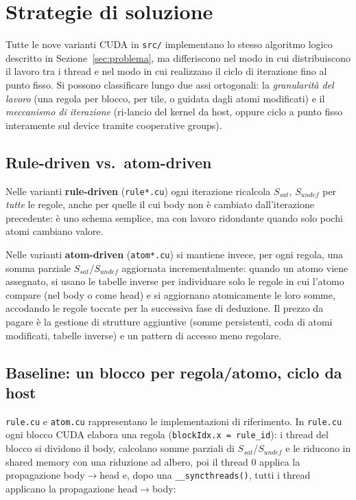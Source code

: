 \documentclass[11pt,a4paper]{article}
\begin{document}
\section{Strategie di soluzione}
\label{sec:strategie}

Tutte le nove varianti CUDA in \texttt{src/} implementano lo stesso algoritmo logico descritto in
Sezione~\ref{sec:problema}, ma differiscono nel modo in cui distribuiscono il lavoro tra i thread e
nel modo in cui realizzano il ciclo di iterazione fino al punto fisso. Si possono classificare
lungo due assi ortogonali: la \emph{granularità del lavoro} (una regola per blocco, per tile, o
guidata dagli atomi modificati) e il \emph{meccanismo di iterazione} (ri-lancio del kernel da host,
oppure ciclo a punto fisso interamente sul device tramite cooperative groups).

\subsection{Rule-driven vs.\ atom-driven}

Nelle varianti \textbf{rule-driven} (\texttt{rule*.cu}) ogni iterazione ricalcola $S_{sat}$,
$S_{undef}$ per \emph{tutte} le regole, anche per quelle il cui body non è cambiato dall'iterazione
precedente: è uno schema semplice, ma con lavoro ridondante quando solo pochi atomi cambiano valore.

Nelle varianti \textbf{atom-driven} (\texttt{atom*.cu}) si mantiene invece, per ogni regola, una
somma parziale $S_{sat}$/$S_{undef}$ aggiornata incrementalmente: quando un atomo viene assegnato,
si usano le tabelle inverse per individuare solo le regole in cui l'atomo compare (nel body o come
head) e si aggiornano atomicamente le loro somme, accodando le regole toccate per la successiva
fase di deduzione. Il prezzo da pagare è la gestione di strutture aggiuntive (somme persistenti,
coda di atomi modificati, tabelle inverse) e un pattern di accesso meno regolare.

\subsection{Baseline: un blocco per regola/atomo, ciclo da host}

\texttt{rule.cu} e \texttt{atom.cu} rappresentano le implementazioni di riferimento. In
\texttt{rule.cu} ogni blocco CUDA elabora una regola (\texttt{blockIdx.x = rule\_id}): i thread del
blocco si dividono il body, calcolano somme parziali di $S_{sat}$/$S_{undef}$ e le riducono in
shared memory con una riduzione ad albero, poi il thread 0 applica la propagazione body$\to$head
e, dopo una \texttt{\_\_syncthreads()}, tutti i thread applicano la propagazione head$\to$body:
\end{document}
